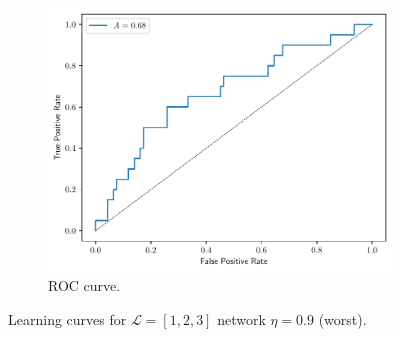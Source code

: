 \documentclass[conference]{IEEEtran}
\theoremstyle{definition}
\theoremstyle{remark}
\theoremstyle{remark}
\begin{document}
\begin{figure}
    \begin{subfigure}[b]{0.32\textwidth}
        \centering
        \includegraphics[width=\textwidth]{figs/1-2-3-0.9-roc.pdf}
        \caption{ROC curve.}
    \end{subfigure}
    \caption{Learning curves for $\mathcal{L}=[1,2,3]$ network $\eta=0.9$
    (worst).}
    \label{fig:NN-worst}
\end{figure}
\end{document}
